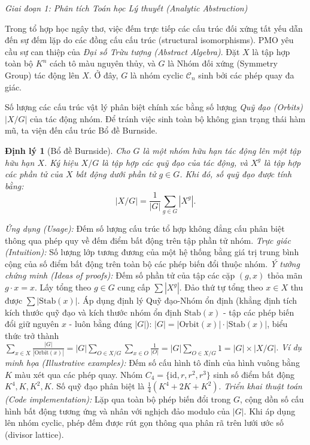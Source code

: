 \documentclass{article}
\newtheorem{dinhly}{Định lý}
\begin{document}
\vspace{0.5em}\noindent\emph{Giai đoạn 1: Phân tích Toán học Lý thuyết (Analytic Abstraction)}

Trong tổ hợp học ngây thơ, việc đếm trực tiếp các cấu trúc đối xứng tất yếu dẫn đến sự đếm lặp do các đồng cấu cấu trúc (structural isomorphisms). PMO yêu cầu sự can thiệp của \textit{Đại số Trừu tượng (Abstract Algebra)}. Đặt $X$ là tập hợp toàn bộ $K^n$ cách tô màu nguyên thủy, và $G$ là Nhóm đối xứng (Symmetry Group) tác động lên $X$. Ở đây, $G$ là nhóm cyclic $\mathcal{C}_n$ sinh bởi các phép quay đa giác.

Số lượng các cấu trúc vật lý phân biệt chính xác bằng số lượng \textit{Quỹ đạo (Orbits)} $|X/G|$ của tác động nhóm. Để tránh việc sinh toàn bộ không gian trạng thái hàm mũ, ta viện đến cấu trúc Bổ đề Burnside.

\begin{dinhly}[Bổ đề Burnside]
Cho $G$ là một nhóm hữu hạn tác động lên một tập hữu hạn $X$. Ký hiệu $X/G$ là tập hợp các quỹ đạo của tác động, và $X^g$ là tập hợp các phần tử của $X$ bất động dưới phần tử $g \in G$. Khi đó, số quỹ đạo được tính bằng:
\begin{equation*}
 |X/G| = \frac{1}{|G|} \sum_{g \in G} |X^g|.
\end{equation*}
\end{dinhly}
\emph{Ứng dụng (Usage):} Đếm số lượng cấu trúc tổ hợp không đẳng cấu phân biệt thông qua phép quy về đếm điểm bất động trên tập phần tử nhóm.
\emph{Trực giác (Intuition):} Số lượng lớp tương đương của một hệ thống bằng giá trị trung bình cộng của số điểm bất động trên toàn bộ các phép biến đổi thuộc nhóm.
\emph{Ý tưởng chứng minh (Ideas of proofs):} Đếm số phần tử của tập các cặp $(g, x)$ thỏa mãn $g \cdot x = x$. Lấy tổng theo $g \in G$ cung cấp $\sum |X^g|$. Đảo thứ tự tổng theo $x \in X$ thu được $\sum |\text{Stab}(x)|$. Áp dụng định lý Quỹ đạo-Nhóm ổn định (khẳng định tích kích thước quỹ đạo và kích thước nhóm ổn định $\text{Stab}(x)$ - tập các phép biến đổi giữ nguyên $x$ - luôn bằng đúng $|G|$): $|G| = |\text{Orbit}(x)| \cdot |\text{Stab}(x)|$, biểu thức trở thành $\sum_{x \in X} \frac{|G|}{|\text{Orbit}(x)|} = |G| \sum_{O \in X/G} \sum_{x \in O} \frac{1}{|O|} = |G| \sum_{O \in X/G} 1 = |G| \times |X/G|$.
\emph{Ví dụ minh họa (Illustrative examples):} Đếm số cấu hình tô đỉnh của hình vuông bằng $K$ màu xét qua các phép quay. Nhóm $C_4 = \{\text{id}, r, r^2, r^3\}$ sinh số điểm bất động $K^4, K, K^2, K$. Số quỹ đạo phân biệt là $\frac{1}{4}(K^4 + 2K + K^2)$.
\emph{Triển khai thuật toán (Code implementation):} Lặp qua toàn bộ phép biến đổi trong $G$, cộng dồn số cấu hình bất động tương ứng và nhân với nghịch đảo modulo của $|G|$. Khi áp dụng lên nhóm cyclic, phép đếm được rút gọn thông qua phân rã trên lưới ước số (divisor lattice).
\end{document}
